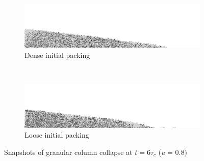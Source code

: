 \begin{figure}[bhp]
\centering
\begin{subfigure}[b]{\textwidth}
\centering
\includegraphics[width=\textwidth]{dense_a08_r6_final}
\caption{Dense initial packing}
\label{fig:dense_a08_r6_final}
\end{subfigure}
\\
\begin{subfigure}[b]{\textwidth}
\centering
\includegraphics[width=\textwidth]{loose_a08_r6_final}
\caption{Loose initial packing}
\label{fig:loose_a08_r6_final}
\end{subfigure}
\caption{Snapshots of granular column collapse at $t = 6 \tau_c$ (\textit{a} = 
0.8)}
\label{fig:density_r6}
\end{figure}


